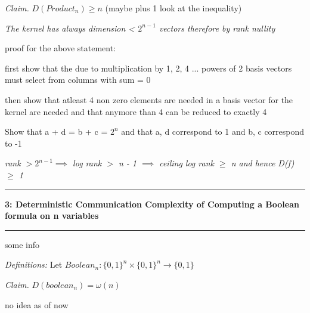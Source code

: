 \documentclass[11pt]{article}
\newcommand\question[2]{\vspace{.25in}\hrule\textbf{#1: #2}\vspace{.5em}\hrule\vspace{.10in}}
\newcommand\definitions{\emph{Definitions:}\newline}
\newcommand\claim{\emph{Claim.}\newline}
\begin{document}
\claim
$D(Product_n) \geq n$ (maybe plus 1 look at the inequality)

\proof
\emph{The kernel has always dimension < $2^{n - 1}$ vectors therefore by rank nullity}

proof for the above statement:

first show that the due to multiplication by 1, 2, 4 ... powers of 2 basis vectors must select from columns with sum = 0

then show that atleast 4 non zero elements are needed in a basis vector for the kernel are needed and that anymore than 4 can be reduced to exactly 4


Show that a + d = b + c = $2^n$ and that a, d correspond to 1 and b, c correspond to -1



\emph{rank $>  2^{n - 1} \implies$ log rank $>$ n - 1 $\implies$ ceiling log rank $\geq$ n and hence D(f) $\geq$ 1}



\newpage

\question{3}{Deterministic Communication Complexity of Computing a Boolean formula on n variables} 

some info

\definitions
Let $Boolean_n: {\{0, 1\}}^n \times {\{0, 1\}}^n \to \{0, 1\}$

\claim
$D(boolean_n) = \omega(n)$ 

\proof 

no idea as of now 

\newpage
\end{document}
